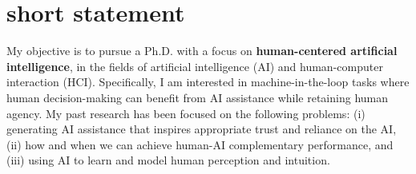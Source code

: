 
\section{short statement}




My objective is to pursue a Ph.D. with a focus on \textbf{human-centered artificial intelligence}, in the fields of artificial intelligence (AI) and human-computer interaction (HCI). Specifically, I am interested in machine-in-the-loop tasks where human decision-making can benefit from AI assistance while retaining human agency. 
My past research has been focused on the following problems: (i) generating AI assistance that inspires appropriate trust and reliance on the AI, (ii) how and when we can achieve human-AI complementary performance, and (iii) using AI to learn and model human perception and intuition.